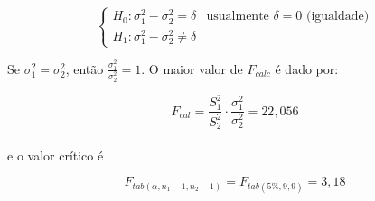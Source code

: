 \documentclass[
]{book}
\begin{document}
\hfill\break

\[
\begin{cases}
        H_{0}: \sigma_{1}^{2}-\sigma_{2}^{2}=\delta & \text{usualmente $\delta=0$ (igualdade)}\\
        H_{1}: \sigma_{1}^{2} - \sigma_{2}^{2} \ne \delta
\end{cases}
\]

\hfill\break

Se \(\sigma_{1}^{2}=\sigma_{2}^{2}\), então \(\frac{\sigma_{1}^{2}}{\sigma_{2}^{2}}=1\). O maior valor de \(F_{calc}\) é dado por:

\hfill\break

\[
F_{cal}=\frac{{S}_{1}^{2}}{{S}_{2}^{2}}\cdot \frac{{\sigma }_{1}^{2}}{{\sigma }_{2}^2}=22,056
\]\\

e o valor crítico é

\hfill\break

\[
{F}_{tab\left(\alpha ,{n}_{1}-1,{n}_{2}-1\right)} = {F}_{tab\left(5\% ,9,9\right)} = 3,18
\]

\hfill\break
\end{document}
